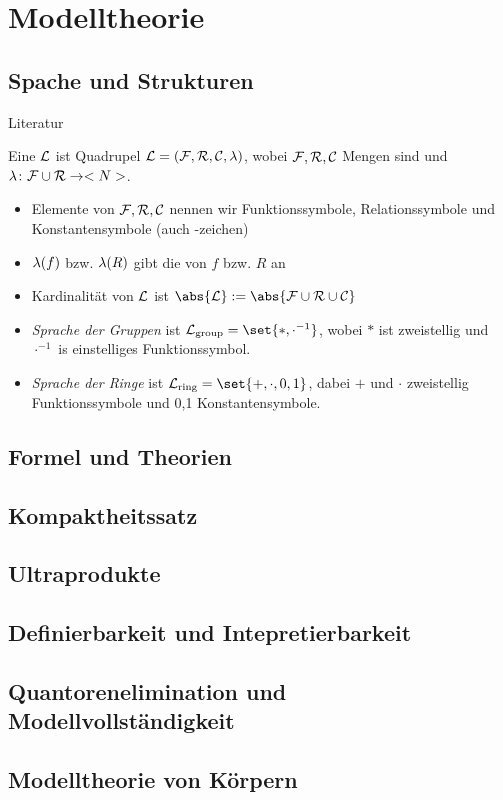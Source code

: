 \section{Modelltheorie}
\subsection{Spache und Strukturen}
Literatur
\begin{definition}[Sprache]
	Eine  $\mathcal L$ ist Quadrupel $\mathcal L = (\mathcal F,\mathcal R, \mathcal C, \lambda)$, wobei $\mathcal F,\mathcal R, \mathcal C$ Mengen sind und $\lambda \colon \mathcal F \cup \mathcal R \to <N>$.
	\begin{itemize}
		\item Elemente von $\mathcal F,\mathcal R,\mathcal C$ nennen wir Funktionssymbole, Relationssymbole und Konstantensymbole (auch -zeichen)
		\item $\lambda(f)$ bzw. $\lambda(R)$ gibt die  von $f$ bzw. $R$ an
		\item Kardinalität  von $\mathcal L$ ist $\abs{\LL} := \abs{\FF \cup \RR \cup \CC}$
	\end{itemize}
\end{definition}
\begin{example}
	\begin{itemize}
		\item \emph{Sprache der Gruppen} ist $\LL_{\group} = \set{\ast, \cdot^{-1}}$, wobei $\ast$ ist zweistellig und $\cdot^{-1}$ is einstelliges Funktionssymbol.
		\item \emph{Sprache der Ringe} ist $\LL_{\ring} = \set{+, \cdot, 0, 1}$, dabei $+$ und $\cdot$ zweistellig Funktionssymbole und 0,1 Konstantensymbole.
	\end{itemize}
\end{example}
\subsection{Formel und Theorien}

\subsection{Kompaktheitssatz}

\subsection{Ultraprodukte}

\subsection{Definierbarkeit und Intepretierbarkeit}

\subsection{Quantorenelimination und Modellvollständigkeit}

\subsection{Modelltheorie von Körpern}